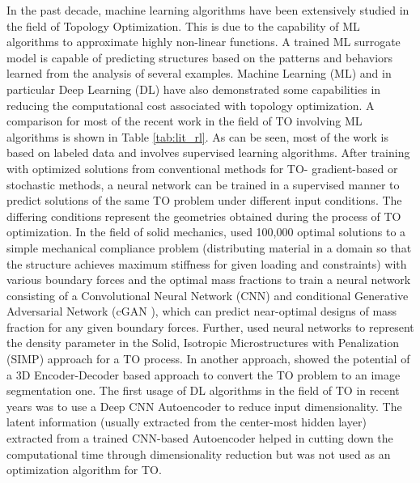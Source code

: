In the past decade, machine learning algorithms have been extensively studied in the ﬁeld of Topology Optimization. This is due to the capability of ML algorithms to approximate highly non-linear functions. A trained ML surrogate model is capable of predicting structures based on the patterns and behaviors learned from the analysis of several examples. Machine Learning (ML) and in particular Deep Learning (DL) have also demonstrated some capabilities in reducing the computational cost associated with topology optimization. A comparison for most of the recent work in the field of TO involving ML algorithms is shown in Table \ref{tab:lit_rl}. As can be seen, most of the work is based on labeled data and involves supervised learning algorithms. After training with optimized solutions from conventional methods for TO- gradient-based or stochastic methods, a neural network can be trained in a supervised manner to predict solutions of the same TO problem under different input conditions. The differing conditions represent the geometries obtained during the process of TO optimization. In the field of solid mechanics, \cite{yu2019deep} used 100,000 optimal solutions to a simple mechanical compliance problem (distributing material in a domain so that the structure achieves maximum stiffness for given loading and constraints) with various boundary forces and the optimal mass fractions to train a neural network consisting of a Convolutional Neural Network (CNN) \parencite{lecun1998gradient} and conditional Generative Adversarial Network (cGAN \parencite{goodfellow2014generative}), which can predict near-optimal designs of mass fraction for any given boundary forces. Further, \cite{chandrasekhartounn} used neural networks to represent the density parameter in the Solid, Isotropic Microstructures with Penalization (SIMP) approach \parencite{rozvany1992generalized} for a TO process. In another approach, \cite{banga20183d} showed the potential of a 3D Encoder-Decoder based approach to convert the TO problem to an image segmentation \parencite{badrinarayanan2017segnet} one. The first usage of DL algorithms in the field of TO \parencite{sosnovik2019neural} in recent years was to use a Deep CNN Autoencoder to reduce input dimensionality. The latent information (usually extracted from the center-most hidden layer) extracted from a trained CNN-based Autoencoder helped in cutting down the computational time through dimensionality reduction but was not used as an optimization algorithm for TO. 

